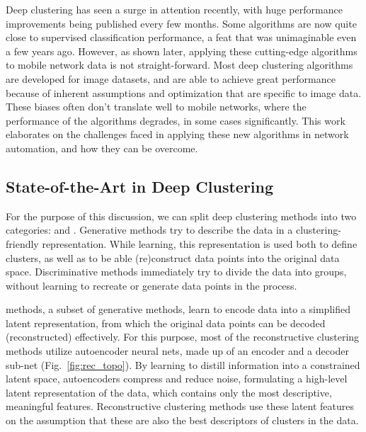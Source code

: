 			Deep clustering has seen a surge in attention recently, with huge performance improvements being published every few months.
			Some algorithms are now quite close to supervised classification performance, a feat that was unimaginable even a few years ago.
			However, as shown later, applying these cutting-edge algorithms to mobile network data is not straight-forward.
			Most deep clustering algorithms are developed for image datasets, and are able to achieve great performance because of inherent assumptions and optimization that are specific to image data.
			These biases often don't translate well to mobile networks, where the performance of the algorithms degrades, in some cases significantly.
			This work elaborates on the challenges faced in applying these new algorithms in network automation, and how they can be overcome.
			
		\subsection{State-of-the-Art in Deep Clustering}
			\label{cha:decorr_ae:sec:sota}
		
			For the purpose of this discussion, we can split deep clustering methods into two categories:  and .
			Generative methods try to describe the data in a clustering-friendly representation.
			While learning, this representation is used both to define clusters, as well as to be able (re)construct data points into the original data space.
			Discriminative methods immediately try to divide the data into groups, without learning to recreate or generate data points in the process.
			
			 methods, a subset of generative methods, learn to encode data into a simplified latent representation, from which the original data points can be decoded (reconstructed) effectively.
			For this purpose, most of the reconstructive clustering methods utilize autoencoder neural nets, made up of an encoder and a decoder sub-net (Fig.~\ref{fig:rec_topo}). 
			By learning to distill information into a constrained latent space, autoencoders compress and reduce noise, formulating a high-level latent representation of the data, which contains only the most descriptive, meaningful features.
			Reconstructive clustering methods use these latent features on the assumption that these are also the best descriptors of clusters in the data.
			
